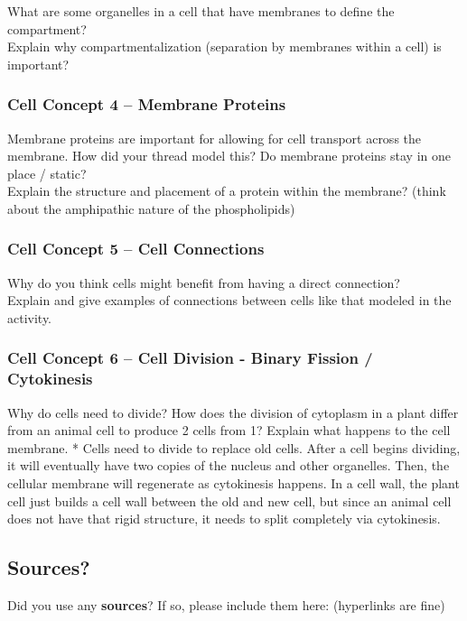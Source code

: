 \documentclass[letterpaper]{article}
\begin{document}
What are some organelles in a cell that have membranes to define the compartment?\\
Explain why compartmentalization (separation by membranes within a cell) is important?

\subsubsection*{Cell Concept 4 -- Membrane Proteins}\label{cell-concept-4-membrane-proteins}

Membrane proteins are important for allowing for cell transport across the membrane. How did your thread model this? Do membrane proteins stay in one place / static?\\
Explain the structure and placement of a protein within the membrane? (think about the amphipathic nature of the phospholipids)

\subsubsection*{Cell Concept 5 -- Cell Connections}\label{cell-concept-5-cell-connections}

Why do you think cells might benefit from having a direct connection?\\
Explain and give examples of connections between cells like that modeled in the activity.

\subsubsection*{Cell Concept 6 -- Cell Division - Binary Fission / Cytokinesis}\label{cell-concept-6-cell-division---binary-fission-cytokinesis}

Why do cells need to divide? How does the division of cytoplasm in a plant differ from an animal cell to produce 2 cells from 1? Explain what happens to the cell membrane.
* Cells need to divide to replace old cells. After a cell begins dividing, it will eventually have two copies of the nucleus and other organelles. Then, the cellular membrane will regenerate as cytokinesis happens. In a cell wall, the plant cell just builds a cell wall between the old and new cell, but since an animal cell does not have that rigid structure, it needs to split completely via cytokinesis.

\subsection*{Sources?}\label{sources}

Did you use any \textbf{sources}? If so, please include them here: (hyperlinks are fine)

\newpage
\end{document}

